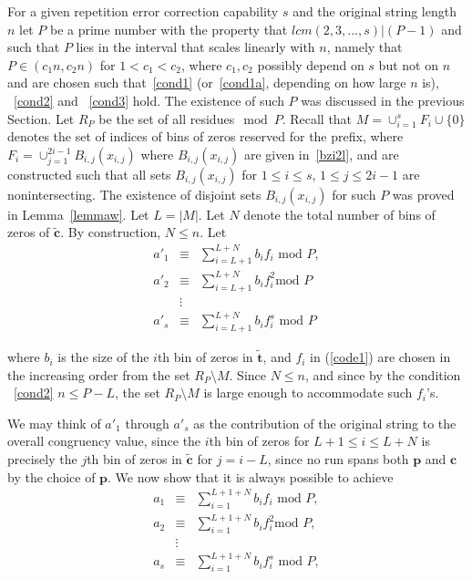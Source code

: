 For a given repetition error correction capability $s$ and the
original string length $n$ let $P$ be a prime number with the
property that $lcm(2,3,...,s)| (P-1)$ and such that $P$ lies in
the interval that scales linearly with $n$, namely that $P \in
(c_1n,c_2n)$ for $1 <c_1 < c_2$, where $c_1,c_2$ possibly depend
on $s$ but not on $n$ and are chosen such that~\eqref{cond1}
(or~\eqref{cond1a}, depending on how large $n$ is), ~\eqref{cond2}
and ~\eqref{cond3} hold. The existence of such $P$ was discussed
in the previous Section. Let $R_P$ be the set of all residues$\mod
P$. Recall that $M=\cup_{i=1}^s F_i \cup \{0\}$ denotes the set of
indices of bins of zeros reserved for the prefix, where $F_i =
\cup_{j=1}^{2i-1} B_{i,j}(x_{i,j})$ where $B_{i,j}(x_{i,j})$ are
given in~\eqref{bzi2l}, and are constructed such that all sets
$B_{i,j}(x_{i,j})$ for $1 \leq i \leq s$, $1 \leq j \leq 2i-1$ are
nonintersecting. The existence of disjoint sets $B_{i,j}(x_{i,j})$
for such $P$ was proved in Lemma~\ref{lemmaw}. Let $L=|M|$. Let
$N$ denote the total number of bins of zeros of
$\tilde{\mathbf{c}}$. By construction, $N \leq n$.
 Let
\begin{equation}\label{code1}\begin{array}{ccc} {a'}_1 &\equiv& \sum_{i=L+1}^{L+N} b_i f_i
\text{ mod } P, \\ {a'}_2 &\equiv& \sum_{i=L+1}^{L+N} b_i f_i^2
\text{
mod } P\\ &\vdots& \\
{a'}_s &\equiv& \sum_{i=L+1}^{L+N} b_i f_i^s \text{ mod }
P\end{array}\end{equation}

where $b_i$ is the size of the $i$th bin of zeros in
$\tilde{\mathbf{t}}$, and $f_i$ in (\ref{code1}) are chosen in the
increasing order from the set $R_P\setminus M$. Since $N \leq n$,
and since by the condition ~\eqref{cond2}  $n \leq P-L$, the set
$R_P\setminus M$ is large enough to accommodate such $f_i$'s.

We may think of ${a'}_1$ through ${a'}_s$ as the contribution of
the original string  to the overall congruency value, since the
$i$th bin of zeros for $L+1 \leq i \leq L+N$ is precisely the
$j$th bin of zeros in $\tilde{\mathbf{c}}$ for $j=i-L$, since no
run spans both $\mathbf{p}$ and $\mathbf{c}$ by the choice of
$\mathbf{p}$. We now show that it is always possible to achieve
\begin{equation}\label{s1}\begin{array}{ccc} a_1 &\equiv& \sum_{i=1}^{L+1+N} b_i f_i
\text{ mod } P, \\ a_2 &\equiv& \sum_{i=1}^{L+1+N} b_i f_i^2
\text{
mod } P,\\ &\vdots& \\
a_s &\equiv& \sum_{i=1}^{L+1+N} b_i f_i^s \text{ mod }
P,\end{array}\end{equation}

